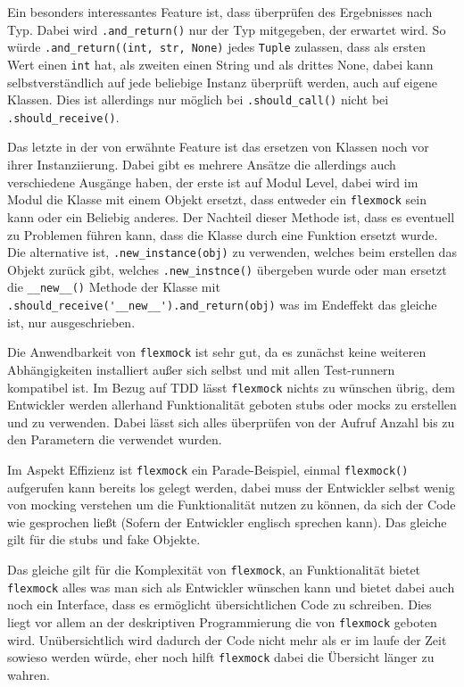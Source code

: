 Ein besonders interessantes Feature ist, dass überprüfen des Ergebnisses nach Typ. Dabei
wird \lstinline{.and_return()} nur der Typ mitgegeben, der erwartet wird. So würde
\lstinline{.and_return((int, str, None)} jedes \lstinline{Tuple} zulassen, dass als ersten Wert einen
\lstinline{int} hat, als zweiten einen String und als drittes None, dabei kann selbstverständlich auf
jede beliebige Instanz überprüft werden, auch auf eigene Klassen. Dies ist allerdings nur
möglich bei \lstinline{.should_call()} nicht bei \lstinline{.should_receive()}.

Das letzte in der von \cite{flexmock:docs:0.10.3} erwähnte Feature ist das ersetzen von
Klassen noch vor ihrer Instanziierung. Dabei gibt es mehrere Ansätze die allerdings auch
verschiedene Ausgänge haben, der erste ist auf Modul Level, dabei wird im Modul die Klasse
mit einem Objekt ersetzt, dass entweder ein \lstinline{flexmock} sein kann oder ein Beliebig
anderes. Der Nachteil dieser Methode ist, dass es eventuell zu Problemen führen kann, dass
die Klasse durch eine Funktion ersetzt wurde. Die alternative ist, \lstinline{.new_instance(obj)}
zu verwenden, welches beim erstellen das Objekt zurück gibt, welches \lstinline{.new_instnce()}
übergeben wurde oder man ersetzt die \lstinline{__new__()} Methode der Klasse mit
\lstinline{.should_receive('__new__').and_return(obj)} was im Endeffekt das gleiche ist, nur
ausgeschrieben.

Die Anwendbarkeit von \lstinline{flexmock} ist sehr gut, da es zunächst keine
weiteren Abhängigkeiten installiert außer sich selbst und mit allen Test-runnern
kompatibel ist. Im Bezug auf TDD lässt \lstinline{flexmock} nichts zu wünschen übrig,
dem Entwickler werden allerhand Funktionalität geboten \Glspl{stub} oder \Glspl{mock} zu
erstellen und zu verwenden. Dabei lässt sich alles überprüfen von der Aufruf Anzahl bis zu
den Parametern die verwendet wurden.

Im Aspekt Effizienz ist \lstinline{flexmock} ein Parade-Beispiel, einmal \lstinline{flexmock()}
aufgerufen kann bereits los gelegt werden, dabei muss der Entwickler selbst wenig von
\gls{mock}ing verstehen um die Funktionalität nutzen zu können, da sich der Code wie gesprochen
ließt (Sofern der Entwickler englisch sprechen kann). Das gleiche gilt für die \Glspl{stub} und
fake Objekte.

Das gleiche gilt für die Komplexität von \lstinline{flexmock}, an Funktionalität bietet
\lstinline{flexmock} alles was man sich als Entwickler wünschen kann und bietet dabei auch
noch ein Interface, dass es ermöglicht übersichtlichen Code zu schreiben. Dies liegt vor allem
an der deskriptiven Programmierung die von \lstinline{flexmock} geboten wird. Unübersichtlich
wird dadurch der Code nicht mehr als er im laufe der Zeit sowieso werden würde, eher noch hilft
\lstinline{flexmock} dabei die Übersicht länger zu wahren.

